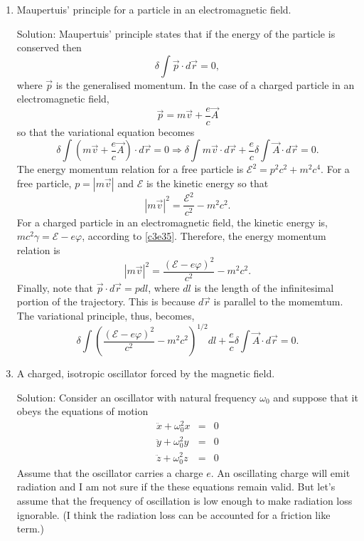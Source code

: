 \begin{enumerate}
\item Maupertuis' principle for a particle in an electromagnetic field.
\item[Solution:] Maupertuis' principle states that if the energy of the particle is
conserved then 
\[
\delta\int\vec{p}\cdot d\vec{r} = 0,
\]
where $\vec{p}$ is the generalised momentum. In the case of a charged particle in
an electromagnetic field,
\[
\vec{p} = m\vec{v} + \frac{e}{c}\vec{A}
\]
so that the variational equation becomes
\[
\delta\int\left(m\vec{v} + \frac{e}{c}\vec{A}\right)\cdot d\vec{r} = 0 \Rightarrow
\delta\int m\vec{v}\cdot d\vec{r} + \frac{e}{c}\delta\int\vec{A}\cdot d\vec{r} = 0.
\]
The energy momentum relation for a free particle is $\mathcal{E}^2 = p^2c^2 + 
m^2c^4$. For a free particle, $p = |m\vec{v}|$ and $\mathcal{E}$ is the kinetic
energy so that
\[
|m\vec{v}|^2 = \frac{\mathcal{E}^2}{c^2} - m^2c^2.
\]
For a charged particle in an electromagnetic field, the kinetic energy is, $mc^2
\gamma = \mathcal{E} - e\varphi$, according to \eqref{c3e35}. Therefore, the energy
momentum relation is
\[
|m\vec{v}|^2 = \frac{(\mathcal{E} - e\varphi)^2}{c^2} - m^2c^2.
\]
Finally, note that $\vec{p}\cdot d\vec{r} = pdl$, where $dl$ is the length of the
infinitesimal portion of the trajectory. This is because $d\vec{r}$ is parallel to
the momemtum. The variational principle, thus, becomes,
\[
\delta\int \left(\frac{(\mathcal{E} - e\varphi)^2}{c^2} - m^2c^2\right)^{1/2}dl + 
\frac{e}{c}\delta\int\vec{A}\cdot d\vec{r} = 0.
\]

\item A charged, isotropic oscillator forced by the magnetic field.
\item[Solution:] Consider an oscillator with natural frequency $\omega_0$ and 
suppose that it obeys the equations of motion
\begin{eqnarray*}
\ddot{x} + \omega_0^2 x &=& 0 \\
\ddot{y} + \omega_0^2 y &=& 0 \\
\ddot{z} + \omega_0^2 z &=& 0
\end{eqnarray*}
Assume that the oscillator carries a charge $e$. An oscillating charge will emit
radiation and I am not sure if the these equations remain valid. But let's assume
that the frequency of oscillation is low enough to make radiation loss ignorable.
(I think the radiation loss can be accounted for a friction like term.)


\end{enumerate}
